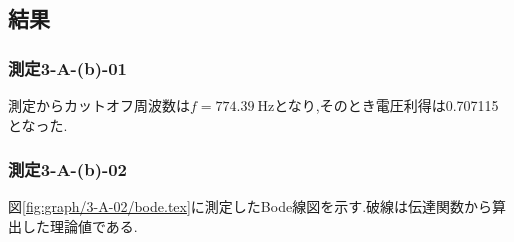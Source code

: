 \subsection{結果}
\subsubsection{測定3-A-(b)-01}
測定からカットオフ周波数は$f=774.39\ \si{\hertz}$となり,そのとき電圧利得は0.707115となった.
\subsubsection{測定3-A-(b)-02}
図\ref{fig:graph/3-A-02/bode.tex}に測定したBode線図を示す.破線は伝達関数から算出した理論値である.
